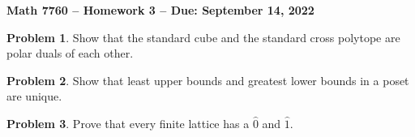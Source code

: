 \documentclass[letterpaper,11pt]{amsart}
\theoremstyle{plain}
\theoremstyle{definition}
\newtheorem{pr}{Problem}
\theoremstyle{remark}
\begin{document}
\Large

\begin{center}
{\bf Math 7760 -- Homework  3 --  Due:  September 14, 2022}
\end{center}

\normalsize


\bigskip


\bigskip

\begin{pr}
    Show that the standard cube and the standard cross polytope are polar duals of each other.
\end{pr}

\begin{pr}\label{pr: least upper bounds are unique}
    Show that least upper bounds and greatest lower bounds in a poset are unique.
\end{pr}

\begin{pr}\label{pr: lattices have zero-hats and one-hats}
    Prove that every finite lattice has a $\hat{0}$ and $\hat{1}$.
\end{pr}
\end{document}
